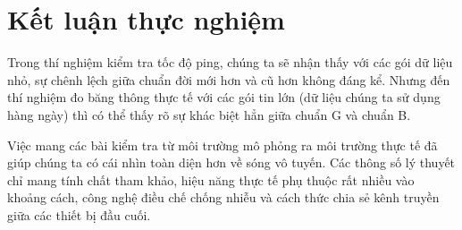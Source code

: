 \documentclass[a4paper, 12pt]{article}
\begin{document}
\section{Kết luận thực nghiệm}

Trong thí nghiệm kiểm tra tốc độ ping, chúng ta sẽ nhận thấy với các gói dữ liệu nhỏ, sự chênh lệch giữa chuẩn đời mới hơn và cũ hơn không đáng kể. Nhưng đến thí nghiệm đo băng thông thực tế với các gói tin lớn (dữ liệu chúng ta sử dụng hàng ngày) thì có thể thấy rõ sự khác biệt hẳn giữa chuẩn G và chuẩn B.

Việc mang các bài kiểm tra từ môi trường mô phỏng ra môi trường thực tế đã giúp chúng ta có cái nhìn toàn diện hơn về sóng vô tuyến. Các thông số lý thuyết chỉ mang tính chất tham khảo, hiệu năng thực tế phụ thuộc rất nhiều vào khoảng cách, công nghệ điều chế chống nhiễu và cách thức chia sẻ kênh truyền giữa các thiết bị đầu cuối. 
\end{document}
